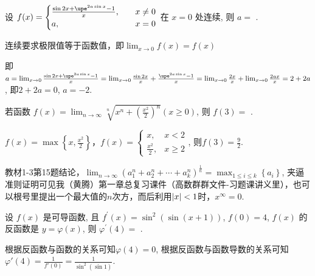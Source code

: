 \documentclass{CWNUExam}
\begin{document}
\begin{problem}
  设 $f(x)=
    \begin{cases}
      \frac{\sin 2 x+\upe^{2 a \sin x}-1}{x}, & \quad x \neq 0 \\
      a,                                      & \quad x=0
    \end{cases}
  $ 在 $x=0$ 处连续, 则 $a=$
  \fillin[$-2$].
\end{problem}

\begin{analysis}
  连续要求极限值等于函数值，即$\lim _{x \to 0} f(x) = f(x)$

  即$a = \lim _{x \to 0} \frac{\sin 2 x+\upe^{2 a \sin x}-1}{x} = \lim _{x \to 0} \frac{\sin 2 x}{x} + \frac{\upe^{2 a \sin x}-1}{x} = \lim _{x \to 0} \frac{2x}{x} + \lim _{x \to 0} \frac{2 a x}{x} = 2+2a$, 即$2+2a=0$, $a=-2$.
\end{analysis}

\begin{problem}
  若函数 $f(x)=\lim _{n \to \infty} \sqrt[n]{x^{n}+\left(\frac{x^{2}}{2}\right)^{n}}(x \geq 0)$, 则 $f(3)=$
  \fillin[$\frac{9}{2}$].
\end{problem}

\begin{analysis}
  $f(x)=\max\left\{ x, \frac{x^2}{2} \right\}$，$f(x) =
    \begin{cases}
      x, & x<2 \\ \frac{x^2}{2}, & x \ge 2
    \end{cases}
  $, 则$f(3) = \frac{9}{2}$.

  \faMortarBoard 教材1-3第15题结论，$\lim_{n\to \infty} \left( a_{1}^{n}+a_{2}^{n}+\cdots +a_{k}^{n} \right) ^{\tfrac{1}{n}}=\max_{1\leqslant i\leqslant k} \left\{ a_i \right\}$, 夹逼准则证明可见我（黄腾）第一章总复习课件（高数群群文件-习题课讲义里），也可以根号里提出一个最大值的$n$次方，而后利用$\left| x \right|<1$时，$x^\infty=0$.
\end{analysis}

\begin{problem}
  设 $f(x)$ 是可导函数, 且 $f^{\prime}(x)=\sin ^{2}(\sin (x+1))$, $f(0)=4$, $f(x)$ 的反函数是 $y=\varphi(x)$, 则 $\varphi^{\prime}(4)=$
  .
\end{problem}

\begin{analysis}
  根据反函数与函数的关系可知$\varphi(4) = 0$, 根据反函数与函数导数的关系可知$\varphi'(4) = \frac{1}{f'(0)} = \frac{1}{\sin^2 (\sin 1)}$.
\end{analysis}
\end{document}
